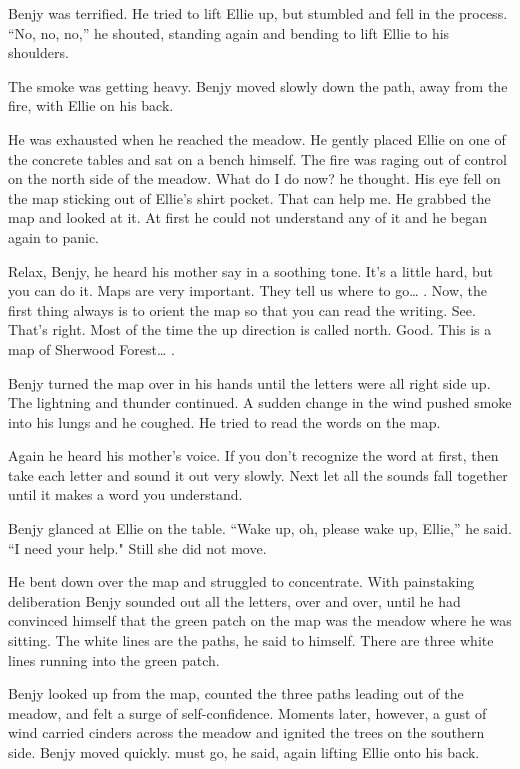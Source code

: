 \documentclass[]{article}
\begin{document}
{Benjy was terrified.  He tried to lift Ellie up, but stumbled and fell in the process.  “No, no, no,” he shouted, standing again and bending to lift Ellie to his shoulders.

The smoke was getting heavy.  Benjy moved slowly down the path, away from the fire, with Ellie on his back.

He was exhausted when he reached the meadow.  He gently placed Ellie on one of the concrete tables and sat on a bench himself.  The fire was raging out of control on the north side of the meadow.  What do I do now? he thought.  His eye fell on the map sticking out of Ellie’s shirt pocket.  That can help me.  He grabbed the map and looked at it.  At first he could not understand any of it and he began again to panic.

Relax, Benjy, he heard his mother say in a soothing tone.  It’s a little hard, but you can do it.  Maps are very important.  They tell us where to go… .  Now, the first thing always is to orient the map so that you can read the writing.  See.  That’s right.  Most of the time the up direction is called north.  Good.  This is a map of Sherwood Forest… .

Benjy turned the map over in his hands until the letters were all right side up.  The lightning and thunder continued.  A sudden change in the wind pushed smoke into his lungs and he coughed.  He tried to read the words on the map.

Again he heard his mother’s voice.  If you don’t recognize the word at first, then take each letter and sound it out very slowly.  Next let all the sounds fall together until it makes a word you understand.

Benjy glanced at Ellie on the table.  “Wake up, oh, please wake up, Ellie,” he said.  “I need your help."  Still she did not move.

He bent down over the map and struggled to concentrate.  With painstaking deliberation Benjy sounded out all the letters, over and over, until he had convinced himself that the green patch on the map was the meadow where he was sitting.  The white lines are the paths, he said to himself.  There are three white lines running into the green patch.

Benjy looked up from the map, counted the three paths leading out of the meadow, and felt a surge of self-confidence.  Moments later, however, a gust of wind carried cinders across the meadow and ignited the trees on the southern side.  Benjy moved quickly.  must go, he said, again lifting Ellie onto his back.

}
\end{document}
